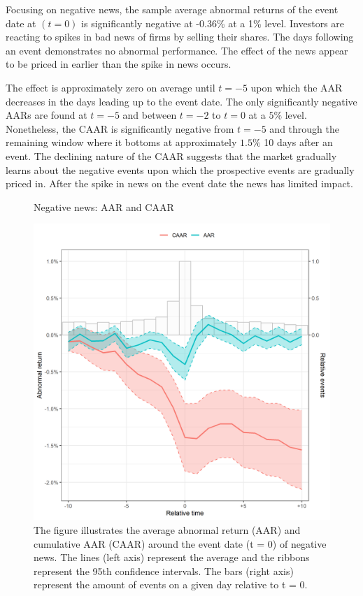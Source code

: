 Focusing on negative news, the sample average abnormal returns of the event date at $(t=0)$ is significantly negative at -0.36\% at a 1\% level. Investors are reacting to spikes in bad news of firms by selling their shares. The days following an event demonstrates no abnormal performance. The effect of the news appear to be priced in earlier than the spike in news occurs. 

The effect is approximately zero on average until $t = -5$ upon which the AAR decreases in the days leading up to the event date. The only significantly negative AARs are found at $t=-5$ and between $t=-2$ to $t=0$ at a $5\%$ level.  Nonetheless, the CAAR is significantly negative from $t=-5$ and through the remaining window where it bottoms at approximately $1.5\%$ 10 days after an event. 
The declining nature of the CAAR suggests that the market gradually learns about the negative events upon which the prospective events are gradually priced in. After the spike in news on the event date the news has limited impact. \\ 


\begin{figure} [H]
    \centering
    \caption{Negative news: AAR and CAAR}
    \includegraphics[scale=0.6]{Projekt/1.Figures analysis/ST_negative_all_CI.png}
     \caption*{\footnotesize The figure illustrates the average abnormal return (AAR) and cumulative AAR (CAAR) around the event date (t = 0) of negative news. The lines (left axis) represent the average and the ribbons represent the 95th confidence intervals. The bars (right axis) represent the amount of events on a given day relative to t = 0. }
    \label{fig:ST_neg_news}
\end{figure} 

